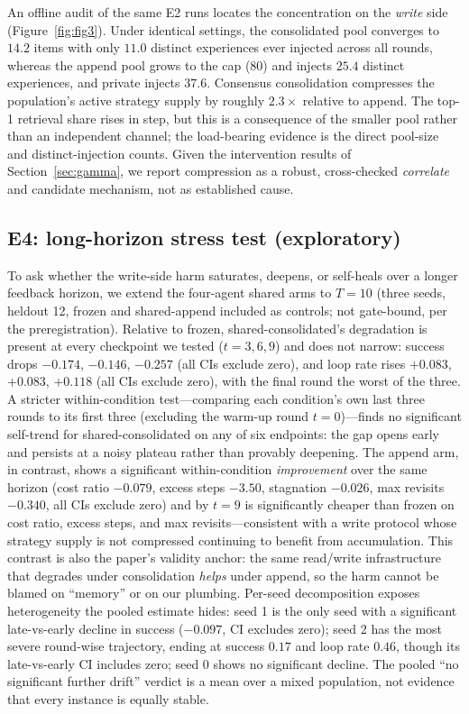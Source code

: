 \documentclass[11pt]{article}
\begin{document}
An offline audit of the same E2 runs locates the concentration on the \emph{write} side
(Figure~\ref{fig:fig3}). Under identical settings, the consolidated pool converges to
$14.2$ items with only $11.0$ distinct experiences ever injected across all rounds, whereas
the append pool grows to the cap ($80$) and injects $25.4$ distinct experiences, and private
injects $37.6$. Consensus consolidation compresses the population's active strategy supply by
roughly $2.3\times$ relative to append. The top-1 retrieval share rises in step, but this is a
consequence of the smaller pool rather than an independent channel; the load-bearing evidence
is the direct pool-size and distinct-injection counts. Given the intervention results of
Section~\ref{sec:gamma}, we report compression as a robust, cross-checked \emph{correlate} and
candidate mechanism, not as established cause.

\subsection{E4: long-horizon stress test (exploratory)}

To ask whether the write-side harm saturates, deepens, or self-heals over a longer feedback
horizon, we extend the four-agent shared arms to $T{=}10$ (three seeds, heldout 12, frozen and
shared-append included as controls; not gate-bound, per the preregistration). Relative to
frozen, shared-consolidated's degradation is present at every checkpoint we tested
($t=3,6,9$) and does not narrow: success drops $-0.174$, $-0.146$, $-0.257$ (all CIs exclude
zero), and loop rate rises $+0.083$, $+0.083$, $+0.118$ (all CIs exclude zero), with the final
round the worst of the three. A stricter within-condition test---comparing each condition's own
last three rounds to its first three (excluding the warm-up round $t{=}0$)---finds no
significant self-trend for shared-consolidated on any of six endpoints: the gap opens early
and persists at a noisy plateau rather than provably deepening. The append arm, in contrast,
shows a significant within-condition \emph{improvement} over the same horizon (cost ratio
$-0.079$, excess steps $-3.50$, stagnation $-0.026$, max revisits $-0.340$, all CIs exclude
zero) and by $t{=}9$ is significantly cheaper than frozen on cost ratio, excess steps, and max
revisits---consistent with a write protocol whose strategy supply is not compressed continuing
to benefit from accumulation. This contrast is also the paper's validity anchor: the same
read/write infrastructure that degrades under consolidation \emph{helps} under append, so the
harm cannot be blamed on ``memory'' or on our plumbing. Per-seed decomposition exposes
heterogeneity the pooled estimate hides: seed 1 is the only seed with a significant
late-vs-early decline in success ($-0.097$, CI excludes zero); seed 2 has the most severe
round-wise trajectory, ending at success $0.17$ and loop rate $0.46$, though its late-vs-early
CI includes zero; seed 0 shows no significant decline. The pooled ``no significant further
drift'' verdict is a mean over a mixed population, not evidence that every instance is equally
stable.
\end{document}
